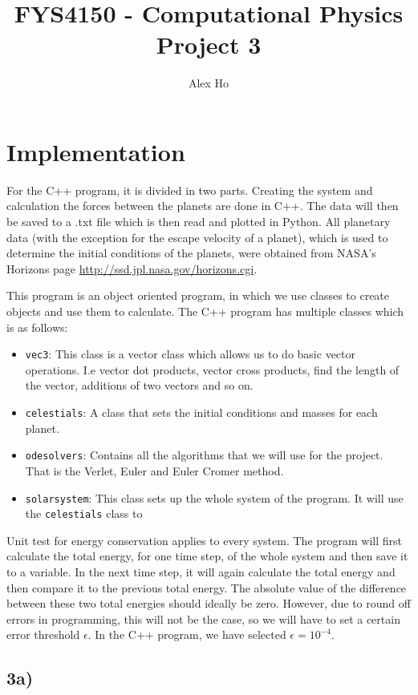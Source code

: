 \documentclass[12pt]{article}
\author{Alex Ho}
\title{FYS4150 - Computational Physics \\ Project 3}
\begin{document}
\maketitle
\section*{Implementation}
For the C++ program, it is divided in two parts. Creating the system and calculation the forces between the planets are done in C++. The data will then be saved to a .txt file which is then read and plotted in Python. All planetary data (with the exception for the escape velocity of a planet), which is used to determine the initial conditions of the planets, were obtained from NASA's Horizons page \url{http://ssd.jpl.nasa.gov/horizons.cgi}. 

This program is an object oriented program, in which we use classes to create objects and use them to calculate. The C++ program has multiple classes which is as follows:
\begin{itemize}
\item \texttt{vec3}: This class is a vector class which allows us to do basic vector operations. I.e vector dot products, vector cross products, find the length of the vector, additions of two vectors and so on.
\item \texttt{celestials}: A class that sets the initial conditions and masses for each planet. 
\item \texttt{odesolvers}: Contains all the algorithms that we will use for the project. That is the Verlet, Euler and Euler Cromer method.
\item \texttt{solarsystem}: This class sets up the whole system of the program. It will use the \texttt{celestials} class to 
\end{itemize}

Unit test for energy conservation applies to every system. The program will first calculate the total energy, for one time step, of the whole system and then save it to a variable. In the next time step, it will again calculate the total energy and then compare it to the previous total energy. The absolute value of the difference between these two total energies should ideally be zero. However, due to round off errors in programming, this will not be the case, so we will have to set a certain error threshold $\epsilon$. In the C++ program, we have selected $\epsilon = 10^{-4}$.

\subsection*{3a)}
\end{document}
